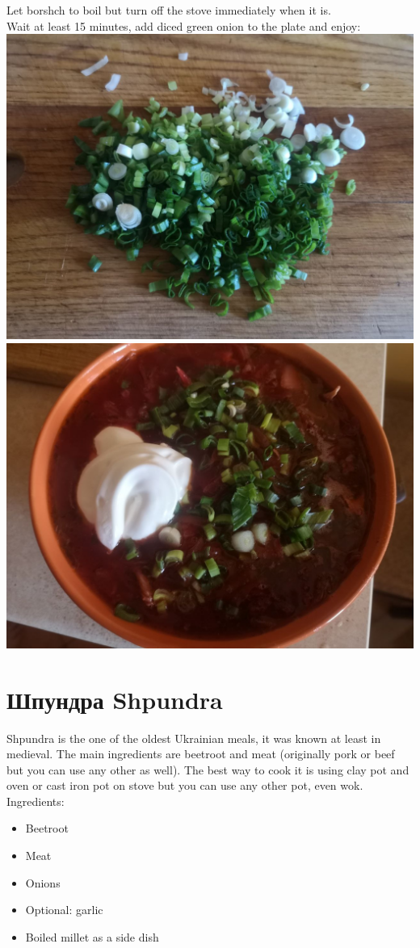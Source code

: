 \documentclass[11pt,a4paper]{article}
\begin{document}
Let borshch to boil but turn off the stove immediately when it is. \\
Wait at least 15 minutes, add diced green onion to the plate and enjoy: \\
\includegraphics[width=\textwidth]{18.jpg} \\
\includegraphics[width=\textwidth]{19.jpg} \\


\section*{Шпундра Shpundra \textipa{['SpundrA]}}
Shpundra is the one of the oldest Ukrainian meals, it was known at least in medieval. The main ingredients are beetroot and meat (originally pork or beef but you can use any other as well). The best way to cook it is using clay pot and oven or cast iron pot on stove but you can use any other pot, even wok. \\
Ingredients:
\begin{itemize}
\item Beetroot
\item Meat
\item Onions
\item Optional: garlic
\item Boiled millet as a side dish
\end{itemize}
\end{document}
